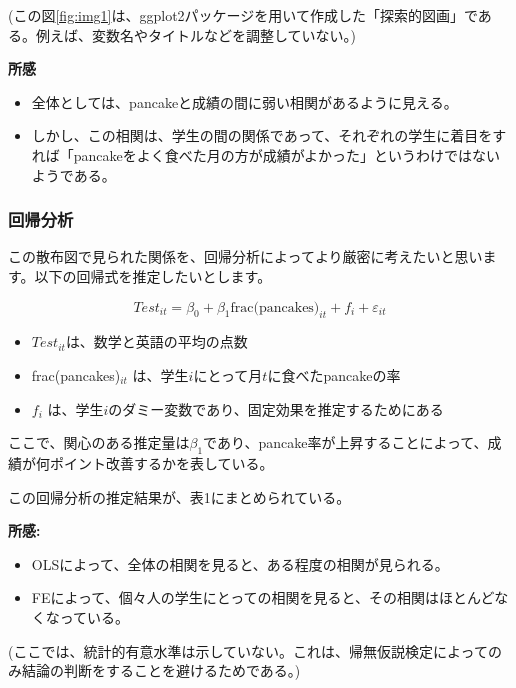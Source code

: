 \documentclass[xelatex,ja=standard]{bxjsarticle}
\begin{document}
(この図\ref{fig:img1}は、ggplot2パッケージを用いて作成した「探索的図画」である。例えば、変数名やタイトルなどを調整していない。)

\textbf{所感}
\begin{itemize}
\item 全体としては、pancakeと成績の間に弱い相関があるように見える。
\item しかし、この相関は、学生の間の関係であって、それぞれの学生に着目をすれば「pancakeをよく食べた月の方が成績がよかった」というわけではないようである。
\end{itemize}

\subsubsection{回帰分析}
この散布図で見られた関係を、回帰分析によってより厳密に考えたいと思います。以下の回帰式を推定したいとします。

\begin{equation}
Test_{it} = \beta_0 + \beta_{1} \text{frac(pancakes)}_{it} + f_{i} + \varepsilon_{it}

\end{equation}

\begin{itemize}
\item $Test_{it}$は、数学と英語の平均の点数
\item frac(pancakes)$_{it}$ は、学生$i$にとって月$t$に食べたpancakeの率
\item $f_i$ は、学生$i$のダミー変数であり、固定効果を推定するためにある
\end{itemize}

ここで、関心のある推定量は$\beta_{1}$であり、pancake率が上昇することによって、成績が何ポイント改善するかを表している。



この回帰分析の推定結果が、表1にまとめられている。

\textbf{所感:}
\begin{itemize}
\item OLSによって、全体の相関を見ると、ある程度の相関が見られる。
\item FEによって、個々人の学生にとっての相関を見ると、その相関はほとんどなくなっている。
\end{itemize}

(ここでは、統計的有意水準は示していない。これは、帰無仮説検定によってのみ結論の判断をすることを避けるためである。)
\end{document}
